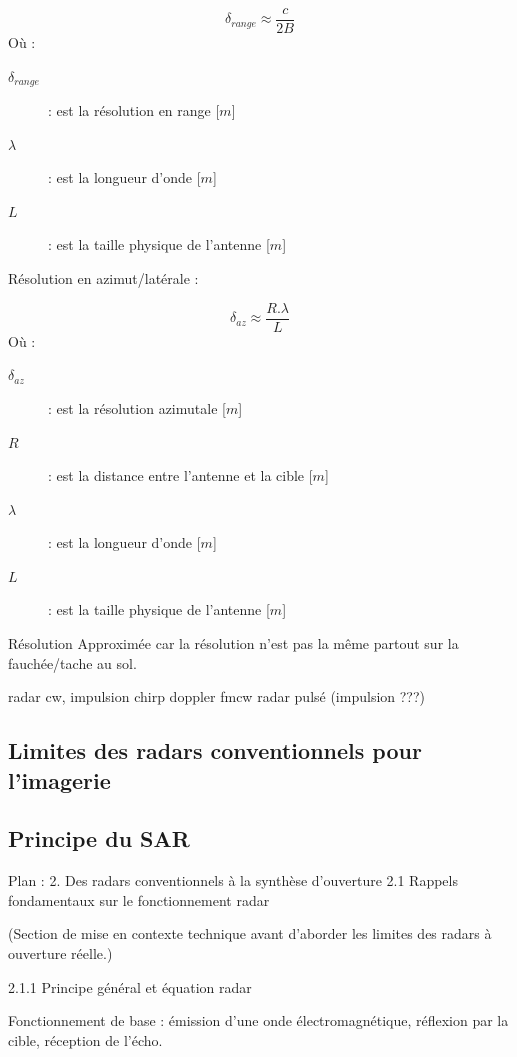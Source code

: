 \begin{equation}
    \delta_{range} \approx \frac{c}{2B}
\end{equation}
Où :
\begin{description}
    \item[$\delta_{range}$] : est la résolution en range [$m$]
    \item[$\lambda$] : est la longueur d’onde [$m$]
    \item[$L$] : est la taille physique de l'antenne [$m$]
\end{description}

Résolution en azimut/latérale :

\begin{equation}
    \delta_{az} \approx \frac{R. \lambda}{L}
\end{equation}
Où :
\begin{description}
    \item[$\delta_{az}$] : est la résolution azimutale [$m$]
    \item[$R$] : est la distance entre l'antenne et la cible [$m$]
    \item[$\lambda$] : est la longueur d’onde [$m$]
    \item[$L$] : est la taille physique de l'antenne [$m$]
\end{description}

Résolution Approximée car la résolution n'est pas la même partout sur la fauchée/tache au sol.

radar cw,
impulsion
chirp
doppler
fmcw
radar pulsé (impulsion ???)

\subsection{Limites des radars conventionnels pour l'imagerie}

\subsection{Principe du SAR}

Plan : 2. Des radars conventionnels à la synthèse d’ouverture
2.1 Rappels fondamentaux sur le fonctionnement radar

(Section de mise en contexte technique avant d’aborder les limites des radars à ouverture réelle.)

2.1.1 Principe général et équation radar

Fonctionnement de base : émission d’une onde électromagnétique, réflexion par la cible, réception de l’écho.

